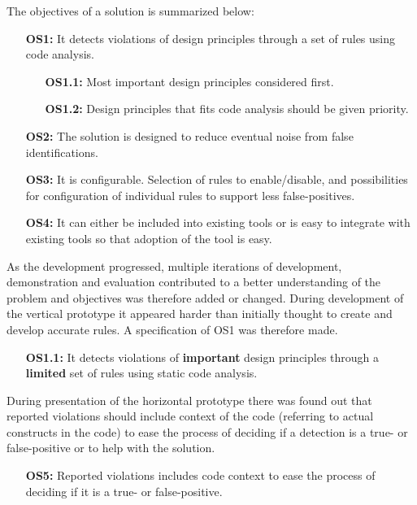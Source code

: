 \documentclass{report}
\begin{document}
The objectives of a solution is summarized below:
\begin{itemize}
    \item [\textbf{OS1:}] It detects violations of design principles through a set of rules using code analysis.
    \begin{itemize}
        \item [\textbf{OS1.1:}] Most important design principles considered first.
        \item [\textbf{OS1.2:}] Design principles that fits code analysis should be given priority.
    \end{itemize}
    \item [\textbf{OS2:}] The solution is designed to reduce eventual noise from false identifications. 
    
    \item [\textbf{OS3:}] It is configurable. Selection of rules to enable/disable, and possibilities for configuration of individual rules to support less false-positives.  
    
    \item [\textbf{OS4:}] It can either be included into existing tools or is easy to integrate with existing tools so that adoption of the tool is easy.
\end{itemize}

As the development progressed, multiple iterations of development, demonstration and evaluation contributed to a better understanding of the problem and objectives was   therefore added or changed. During development of the vertical prototype it appeared harder than initially thought to create and develop accurate rules. A specification of OS1 was therefore made. 

\begin{itemize}
    \item [\textbf{OS1.1:}] It detects violations of \textbf{important} design principles through a \textbf{limited} set of rules using static code analysis.
\end{itemize}

During presentation of the horizontal prototype there was found out that reported violations should include context of the code (referring to actual constructs in the code) to ease the process of deciding if a detection is a true- or false-positive or to help with the solution. 

\begin{itemize}
        \item [\textbf{OS5:}] Reported violations includes code context to ease the process of deciding if it is a true- or false-positive. 
\end{itemize}
\end{document}

